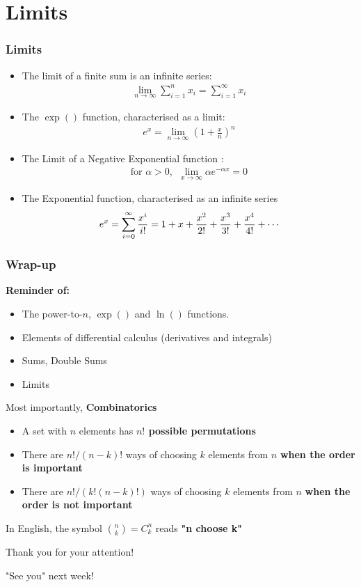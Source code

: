 \documentclass[notes=show, handout]{beamer}\usepackage[]{graphicx}\usepackage[]{color}
\newcommand{\bea}{\begin{eqnarray}}
\newcommand{\eea}{\end{eqnarray}}
\begin{document}
\section{Limits}

\begin{frame}
\frametitle{Limits}

\begin{itemize}
\item The limit of a finite sum is an infinite series:
\bea
\lim_{n \to \infty} \sum_{i=1}^n x_i = \sum_{i=1 }^\infty x_i \nonumber
\eea
\item The $\exp()$ function, characterised as a limit:
\bea
e^x = \lim_{n \rightarrow \infty} \left(1 + \frac{x}{n}\right)^n \nonumber
\eea
\item The Limit of a Negative Exponential function :
\bea
\text{for }\alpha >0, \ \  \lim_{x \to \infty} {\alpha e^{-\alpha x}} = 0 \nonumber
\eea
\item The Exponential function, characterised as an infinite series
\bea
e^x = \sum_{i = 0}^{\infty} {x^i \over i!} = 1 + x + {x^2 \over 2!} + {x^3 \over 3!} + {x^4 \over 4!} + \cdots \nonumber
\eea
\end{itemize}
\end{frame}


\begin{frame}
\frametitle{Wrap-up}


\textbf{Reminder of:}
\begin{itemize}
\item The power-to-$n$, $\exp()$ and $\ln()$ functions.
\item Elements of differential calculus (derivatives and integrals)
\item Sums, Double Sums
\item Limits
\end{itemize}
\pause

Most importantly, \textbf{Combinatorics}

\begin{itemize}
\item A set with $n$ elements has \textbf{$n!$ possible permutations}
\item There are $n!/(n-k)!$ ways of choosing $k$ elements from $n$ \textbf{when the order is important}
\item There are $n!/(k!(n-k)!)$ ways of choosing $k$ elements from $n$ \textbf{when the order is not important}
\end{itemize}


\begin{center}
In English, the symbol $\binom n k = C^n_k$ reads \textbf{"n choose k"}
\end{center}

\end{frame}

\begin{frame}
	\begin{center}

		\LARGE{Thank you for your attention!}

		\pause

		\LARGE{"See you" next week!}
	\end{center}
\end{frame}
\end{document}
